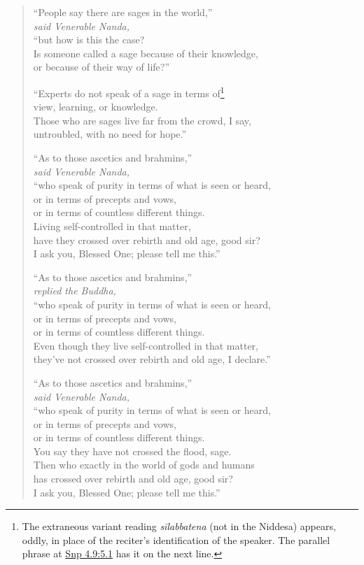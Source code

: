 \documentclass[12pt,openany]{book}%
\newcommand*{\scspeaker}[1]{\hspace{2em}\textit{#1}}
\begin{document}
\begin{verse}%
“People say there are sages in the world,” \\
\scspeaker{said Venerable Nanda, }\\
“but how is this the case? \\
Is someone called a sage because of their knowledge, \\
or because of their way of life?” 

“Experts do not speak of a sage in terms of\footnote{The extraneous variant reading \textit{\textsanskrit{sīlabbatena}} (not in the Niddesa) appears, oddly, in place of the reciter’s identification of the speaker. The parallel phrase at \href{https://suttacentral.net/snp4.9/en/sujato\#5.1}{Snp 4.9:5.1} has it on the next line. } \\
view, learning, or knowledge. \\
Those who are sages live far from the crowd, I say, \\
untroubled, with no need for hope.” 

“As to those ascetics and brahmins,” \\
\scspeaker{said Venerable Nanda, }\\
“who speak of purity in terms of what is seen or heard, \\
or in terms of precepts and vows, \\
or in terms of countless different things. \\
Living self-controlled in that matter, \\
have they crossed over rebirth and old age, good sir? \\
I ask you, Blessed One; please tell me this.” 

“As to those ascetics and brahmins,” \\
\scspeaker{replied the Buddha, }\\
“who speak of purity in terms of what is seen or heard, \\
or in terms of precepts and vows, \\
or in terms of countless different things. \\
Even though they live self-controlled in that matter, \\
they’ve not crossed over rebirth and old age, I declare.” 

“As to those ascetics and brahmins,” \\
\scspeaker{said Venerable Nanda, }\\
“who speak of purity in terms of what is seen or heard, \\
or in terms of precepts and vows, \\
or in terms of countless different things. \\
You say they have not crossed the flood, sage. \\
Then who exactly in the world of gods and humans \\
has crossed over rebirth and old age, good sir? \\
I ask you, Blessed One; please tell me this.” 


\end{verse}
\end{document}
